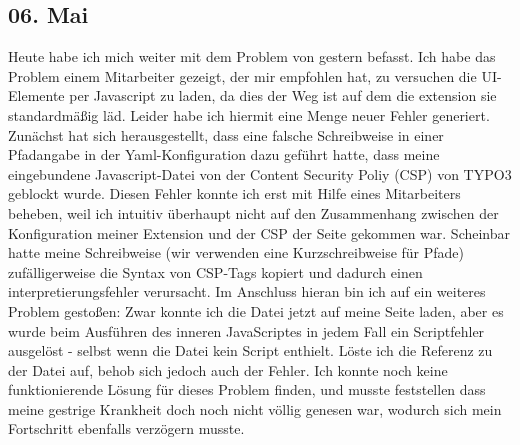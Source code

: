 \subsection{06. Mai}
Heute habe ich mich weiter mit dem Problem von gestern befasst. Ich habe das Problem einem Mitarbeiter gezeigt, der mir empfohlen hat, zu versuchen die UI-Elemente per Javascript zu laden, da dies der Weg ist auf dem die extension sie standardmäßig läd. Leider habe ich hiermit eine Menge neuer Fehler generiert. Zunächst hat sich herausgestellt, dass eine falsche Schreibweise in einer Pfadangabe in der Yaml-Konfiguration dazu geführt hatte, dass meine eingebundene Javascript-Datei von der Content Security Poliy (CSP) von TYPO3 geblockt wurde. Diesen Fehler konnte ich erst mit Hilfe eines Mitarbeiters beheben, weil ich intuitiv überhaupt nicht auf den Zusammenhang zwischen der Konfiguration meiner Extension und der CSP der Seite gekommen war. Scheinbar hatte meine Schreibweise (wir verwenden eine Kurzschreibweise für Pfade) zufälligerweise die Syntax von CSP-Tags kopiert und dadurch einen interpretierungsfehler verursacht. Im Anschluss hieran bin ich auf ein weiteres Problem gestoßen: Zwar konnte ich die Datei jetzt auf meine Seite laden, aber es wurde beim Ausführen des inneren JavaScriptes in jedem Fall ein Scriptfehler ausgelöst - selbst wenn die Datei kein Script enthielt. Löste ich die Referenz zu der Datei auf, behob sich jedoch auch der Fehler. Ich konnte noch keine funktionierende Lösung für dieses Problem finden, und musste feststellen dass meine gestrige Krankheit doch noch nicht völlig genesen war, wodurch sich mein Fortschritt ebenfalls verzögern musste.